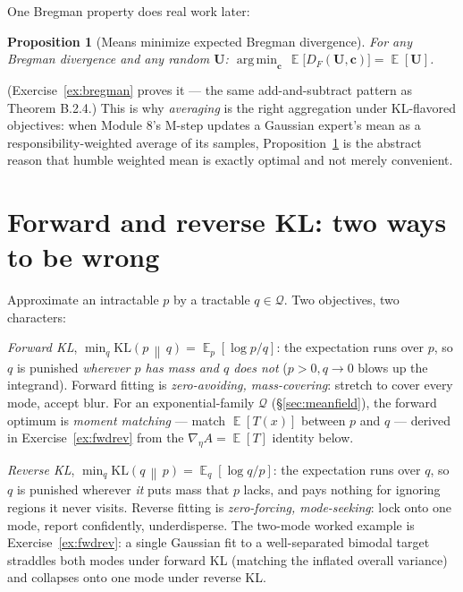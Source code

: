\documentclass[11pt]{article}
\numberwithin{equation}{section}
\theoremstyle{plain}
\newtheorem{proposition}[theorem]{Proposition}
\theoremstyle{definition}
\theoremstyle{remark}
\DeclareMathOperator{\E}{\mathbb{E}}
\DeclareMathOperator*{\argmin}{arg\,min}
\newcommand{\KL}[2]{\mathrm{KL}\!\left(#1 \,\middle\|\, #2\right)}
\begin{document}
One Bregman property does real work later:

\begin{proposition}[Means minimize expected Bregman divergence]\label{prop:bregmean}
For any Bregman divergence and any random $\bm U$:
$\argmin_{\bm c}\, \E\big[ D_F(\bm U, \bm c) \big] = \E[\bm U]$.
\end{proposition}

(Exercise~\ref{ex:bregman} proves it --- the same add-and-subtract pattern as Theorem B.2.4.) This is why \emph{averaging} is the right aggregation under KL-flavored objectives: when Module 8's M-step updates a Gaussian expert's mean as a responsibility-weighted average of its samples, Proposition~\ref{prop:bregmean} is the abstract reason that humble weighted mean is exactly optimal and not merely convenient.

\section{Forward and reverse KL: two ways to be wrong}\label{sec:fwdrev}

Approximate an intractable $p$ by a tractable $q \in \mathcal{Q}$. Two objectives, two characters:

\emph{Forward KL}, $\min_q \KL{p}{q} = \E_p[\log p/q]$: the expectation runs over $p$, so $q$ is punished \emph{wherever $p$ has mass and $q$ does not} ($p > 0, q \to 0$ blows up the integrand). Forward fitting is \emph{zero-avoiding, mass-covering}: stretch to cover every mode, accept blur. For an exponential-family $\mathcal{Q}$ (\S\ref{sec:meanfield}), the forward optimum is \emph{moment matching} --- match $\E[T(x)]$ between $p$ and $q$ --- derived in Exercise~\ref{ex:fwdrev} from the $\nabla_\eta A = \E[T]$ identity below.

\emph{Reverse KL}, $\min_q \KL{q}{p} = \E_q[\log q/p]$: the expectation runs over $q$, so $q$ is punished wherever \emph{it} puts mass that $p$ lacks, and pays nothing for ignoring regions it never visits. Reverse fitting is \emph{zero-forcing, mode-seeking}: lock onto one mode, report confidently, underdisperse. The two-mode worked example is Exercise~\ref{ex:fwdrev}: a single Gaussian fit to a well-separated bimodal target straddles both modes under forward KL (matching the inflated overall variance) and collapses onto one mode under reverse KL.
\end{document}
